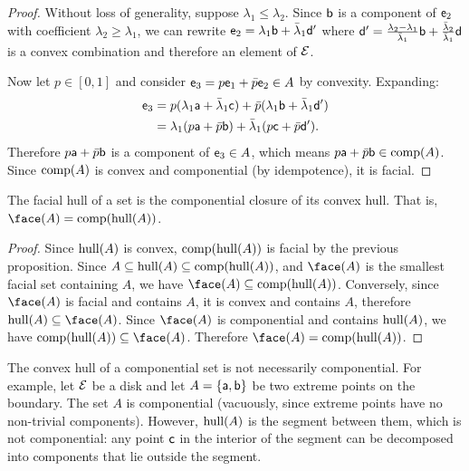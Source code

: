 \begin{mathSection}
\begin{proof}
		Without loss of generality, suppose $\lambda_1 \leq \lambda_2$. Since $\ens[b]$ is a component of $\ens_2$ with coefficient $\lambda_2 \geq \lambda_1$, we can rewrite $\ens_2 = \lambda_1 \ens[b] + \bar{\lambda}_1 \ens[d']$ where $\ens[d'] = \frac{\lambda_2 - \lambda_1}{\bar{\lambda}_1} \ens[b] + \frac{\bar{\lambda}_2}{\bar{\lambda}_1} \ens[d]$ is a convex combination and therefore an element of $\Ens$.
		
		Now let $p \in [0,1]$ and consider $\ens_3 = p \ens_1 + \bar{p} \ens_2 \in A$ by convexity. Expanding:
		\begin{equation}
			\begin{aligned}
				\ens_3 &= p(\lambda_1 \ens[a] + \bar{\lambda}_1 \ens[c]) + \bar{p}(\lambda_1 \ens[b] + \bar{\lambda}_1 \ens[d']) \\
				&= \lambda_1(p \ens[a] + \bar{p} \ens[b]) + \bar{\lambda}_1(p \ens[c] + \bar{p} \ens[d']).
			\end{aligned}
		\end{equation}
		Therefore $p\ens[a] + \bar{p}\ens[b]$ is a component of $\ens_3 \in A$, which means $p\ens[a] + \bar{p}\ens[b] \in \component(A)$. Since $\component(A)$ is convex and componential (by idempotence), it is facial.
	\end{proof}
	
	\begin{coro}
		The facial hull of a set is the componential closure of its convex hull. That is, $\face(A) = \component(\hull(A))$.
	\end{coro}
	
	\begin{proof}
		Since $\hull(A)$ is convex, $\component(\hull(A))$ is facial by the previous proposition. Since $A \subseteq \hull(A) \subseteq \component(\hull(A))$, and $\face(A)$ is the smallest facial set containing $A$, we have $\face(A) \subseteq \component(\hull(A))$. Conversely, since $\face(A)$ is facial and contains $A$, it is convex and contains $A$, therefore $\hull(A) \subseteq \face(A)$. Since $\face(A)$ is componential and contains $\hull(A)$, we have $\component(\hull(A)) \subseteq \face(A)$. Therefore $\face(A) = \component(\hull(A))$.
	\end{proof}
	
	\begin{remark}
		The convex hull of a componential set is not necessarily componential. For example, let $\Ens$ be a disk and let $A = \{\ens[a], \ens[b]\}$ be two extreme points on the boundary. The set $A$ is componential (vacuously, since extreme points have no non-trivial components). However, $\hull(A)$ is the segment between them, which is not componential: any point $\ens[c]$ in the interior of the segment can be decomposed into components that lie outside the segment.
		

\end{remark}
\end{mathSection}
